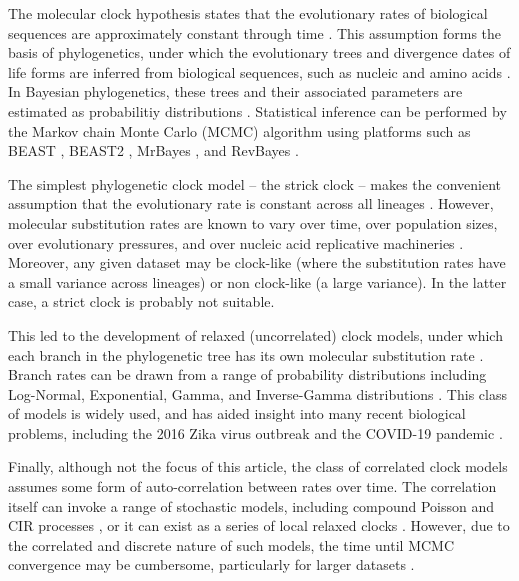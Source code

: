 \documentclass[10pt,letterpaper]{article}
\begin{document}
The molecular clock hypothesis states that the evolutionary rates of biological sequences are approximately constant through time \cite{zuckerkandl1962molecular}.
This assumption forms the basis of phylogenetics, under which the evolutionary trees and divergence dates of life forms are inferred from biological sequences, such as nucleic and amino acids \cite{douzery2003local, drummond2006relaxed}.
In Bayesian phylogenetics, these trees and their associated parameters are estimated as probabilitiy distributions \cite{kuhner1995estimating, larget1999markov, mau1999bayesian}. 
Statistical inference can be performed by the Markov chain Monte Carlo (MCMC) algorithm \cite{metropolis53, hastings70} using platforms such as BEAST \cite{drummond2012bayesian}, BEAST2 \cite{bouckaert2019beast}, MrBayes \cite{ronquist2012mrbayes}, and RevBayes \cite{hohna2016revbayes}.



The simplest phylogenetic clock model -- the strick clock -- makes the convenient assumption that the evolutionary rate is constant across all lineages \cite{zuckerkandl1965evolutionary, kuhner1995estimating, larget1999markov}.  %
However, molecular substitution rates are known to vary over time, over population sizes, over evolutionary pressures, and over nucleic acid replicative machineries \cite{gillespie1994causes, woolfit2009effective, loh2010optimization}.
Moreover, any given dataset may be clock-like (where the substitution rates have a small variance across lineages) or non clock-like (a large variance). 
In the latter case, a strict clock is probably not suitable. 



This led to the development of relaxed (uncorrelated) clock models, under which each branch in the phylogenetic tree has its own molecular substitution rate  \cite{drummond2006relaxed}.
Branch rates can be drawn from a range of probability distributions including Log-Normal, Exponential, Gamma, and Inverse-Gamma distributions \cite{drummond2006relaxed, lepage2007general, li2012model}.
This class of models is widely used, and has aided insight into many recent biological problems, including the 2016 Zika virus outbreak \cite{faria2017establishment} and the COVID-19 pandemic \cite{giovanetti2020first}.

Finally, although not the focus of this article, the class of correlated clock models assumes some form of auto-correlation between rates over time. 
The correlation itself can invoke a range of stochastic models, including compound Poisson \cite{huelsenbeck2000compound} and CIR processes \cite{lepage2007general}, or it can exist as a series of local relaxed clocks \cite{drummond2010bayesian}. 
However, due to the correlated and discrete nature of such models, the time until MCMC convergence may be cumbersome, particularly for larger datasets \cite{drummond2010bayesian}.  
\end{document}
